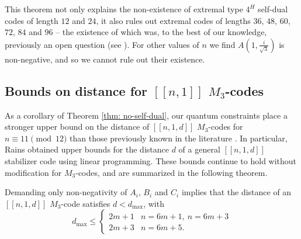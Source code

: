 \documentclass[11pt]{article}
\begin{document}
This theorem not only explains the non-existence of  extremal type $4^H$ self-dual codes of length $12$ and $24$, it also rules out extremal codes of lengths $36$, $48$, $60$, $72$, $84$ and $96$ -- the existence of which was, to the best of our knowledge, previously an open question (see \cite{macwilliams1978self}). For other values of $n$ we find $A(1, \frac{i}{\sqrt{3}})$ is non-negative, and so we cannot rule out their existence. 

\subsection{Bounds on distance for $[[n,1]]$ $M_3$-codes}
\label{sec:odd-n-bounds}
As a corollary of Theorem \ref{thm: no-self-dual}, our quantum constraints place a stronger upper bound on the distance of $[[n,1,d]]$ $M_3$-codes for $n \equiv 11 \pmod {12}$ than those previously known in the literature \cite{rains}. In particular, Rains \cite{rains} obtained upper bounds for the distance $d$ of a general $[[n,1,d]]$ stabilizer code using linear programming. These bounds continue to hold without modification for $M_3$-codes, and are summarized in the following theorem.
\begin{theorem}
    Demanding only non-negativity of $A_i$, $B_i$ and $C_i$ implies that the distance of an $[[n,1,d]]$ $M_{3}$-code satisfies $d<d_{\max}$, with  \begin{equation}
    d_{\text{max}} \leq \begin{cases}
        2m+1  & n = 6m+1, ~
        n=6m+3 \\
       2m  +3  & n = 6m+5.
    \end{cases}
\end{equation}
\label{thm:old-theorem}
\end{theorem}
\end{document}
